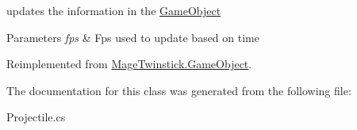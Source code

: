 updates the information in the \hyperlink{class_mage_twinstick_1_1_game_object}{Game\+Object} 


\begin{DoxyParams}{Parameters}
{\em fps} & Fps used to update based on time\\
\hline
\end{DoxyParams}


Reimplemented from \hyperlink{class_mage_twinstick_1_1_game_object_a3de8248d06d234f8335525bbb28ccacc}{Mage\+Twinstick.\+Game\+Object}.



The documentation for this class was generated from the following file\+:\begin{DoxyCompactItemize}
\item 
Projectile.\+cs\end{DoxyCompactItemize}
